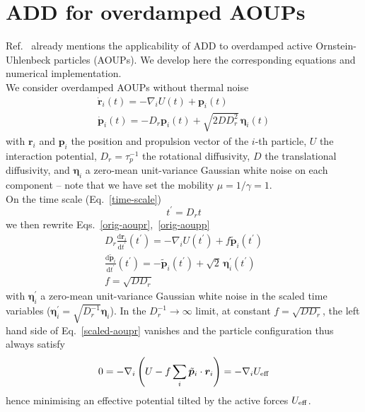 \documentclass[pre,aps,superscriptaddress,longbibliography,notitlepage]{revtex4-1}
\begin{document}
\section{ADD for overdamped AOUPs}

Ref.~\cite{mandal2020study} already mentions the applicability of ADD to overdamped active Ornstein-Uhlenbeck particles (AOUPs). We develop here the corresponding equations and numerical implementation.\\

We consider overdamped AOUPs without thermal noise
\begin{eqnarray}
\label{orig-aoupr}
\dot{\boldsymbol{r}}_i(t) = -\nabla_i U(t) + \boldsymbol{p}_i(t)\\
\label{orig-aoupp}
\dot{\boldsymbol{p}}_i(t) = -D_r \boldsymbol{p}_i(t) + \sqrt{2 D D_r^2} \, \boldsymbol{\eta}_i(t)
\end{eqnarray}
with $\boldsymbol{r}_i$ and $\boldsymbol{p}_i$ the position and propulsion vector of the $i$-th particle, $U$ the interaction potential, $D_r = \tau_p^{-1}$ the rotational diffusivity, $D$ the translational diffusivity, and $\boldsymbol{\eta}_i$ a zero-mean unit-variance Gaussian white noise on each component -- note that we have set the mobility $\mu = 1/\gamma = 1$.\\

On the time scale (Eq.~\ref{time-scale})
\begin{equation}
t^{\prime} = D_r t
\end{equation}
we then rewrite Eqs.~\ref{orig-aoupr},~\ref{orig-aoupp}
\begin{eqnarray}
\label{scaled-aoupr}
D_r \frac{\mathrm{d}\boldsymbol{r}_i}{\mathrm{d}t^{\prime}}(t^{\prime}) = -\nabla_i U(t^{\prime}) + f \tilde{\boldsymbol{p}}_i(t^{\prime})\\
\label{scaled-aoupp}
\frac{\mathrm{d}\tilde{\boldsymbol{p}}_i}{\mathrm{d}t^{\prime}}(t^{\prime}) = -\tilde{\boldsymbol{p}}_i(t^{\prime}) + \sqrt{2} \, \boldsymbol{\eta}^{\prime}_i(t^{\prime})\\
f = \sqrt{D D_r}
\end{eqnarray}
with $\boldsymbol{\eta}^{\prime}_i$ a zero-mean unit-variance Gaussian white noise in the scaled time variables ($\boldsymbol{\eta}^{\prime}_i = \sqrt{D_r^{-1}} \boldsymbol{\eta}_i$). In the $D_r^{-1} \to \infty$ limit, at constant $f = \sqrt{D D_r}$, the left hand side of Eq.~\ref{scaled-aoupr} vanishes and the particle configuration thus always satisfy
\begin{equation}
0 = -\nabla_i\left(U - f \sum_i \tilde{\boldsymbol{p}}_i\cdot\boldsymbol{r}_i\right) = -\nabla_i U_{\rm eff}
\label{Ueff-aoup}
\end{equation}
hence minimising an effective potential tilted by the active forces $U_{\rm eff}$.\\
\end{document}
